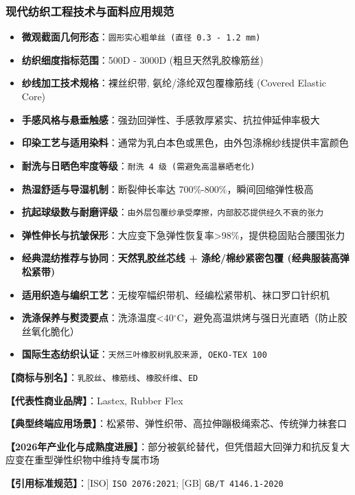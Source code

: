 \documentclass[11pt,openright,twoside,UTF8]{ctexbook}
\begin{document}
\subsubsection*{现代纺织工程技术与面料应用规范}
\begin{itemize} \setlength{\itemsep}{2pt}
    \item \textbf{微观截面几何形态}：\texttt{圆形实心粗单丝 (直径 0.3 - 1.2 mm)}
    \item \textbf{纺织细度指标范围}：500D - 3000D (粗旦天然乳胶橡筋丝)
    \item \textbf{纱线加工技术规格}：裸丝织带, 氨纶/涤纶双包覆橡筋线 (Covered Elastic Core)
    \item \textbf{手感风格与悬垂触感}：强劲回弹性、手感敦厚紧实、抗拉伸延伸率极大
    \item \textbf{印染工艺与适用染料}：通常为乳白本色或黑色，由外包涤棉纱线提供丰富颜色
    \item \textbf{耐洗与日晒色牢度等级}：\texttt{耐洗 4 级 (需避免高温暴晒老化)}
    \item \textbf{热湿舒适与导湿机制}：断裂伸长率达 700\%-800\%，瞬间回缩弹性极高
    \item \textbf{抗起球级数与耐磨评级}：\texttt{由外层包覆纱承受摩擦，内部胶芯提供经久不衰的张力}
    \item \textbf{弹性伸长与抗皱保形}：大应变下急弹性恢复率\textgreater{}98\%，提供稳固贴合腰围张力
    \item \textbf{经典混纺推荐与协同}：\textbf{天然乳胶丝芯线 + 涤纶/棉纱紧密包覆 (经典服装高弹松紧带)}
    \item \textbf{适用织造与编织工艺}：无梭窄幅织带机、经编松紧带机、袜口罗口针织机
    \item \textbf{洗涤保养与熨烫要点}：洗涤温度\textless{}40$^\circ\mathrm{C}$，避免高温烘烤与强日光直晒（防止胶丝氧化脆化）
    \item \textbf{国际生态纺织认证}：\texttt{天然三叶橡胶树乳胶来源, OEKO-TEX 100}
\end{itemize}
\vspace{0.2cm}

\noindent\textbf{【商标与别名】}：\texttt{乳胶丝}、\texttt{橡筋线}、\texttt{橡胶纤维}、\texttt{ED}\par
\noindent\textbf{【代表性商业品牌】}：Lastex, Rubber Flex\par
\noindent\textbf{【典型终端应用场景】}：松紧带、弹性织带、高拉伸蹦极绳索芯、传统弹力袜套口\par
\noindent\textbf{【2026年产业化与成熟度进展】}：部分被氨纶替代，但凭借超大回弹力和抗反复大应变在重型弹性织物中维持专属市场\par
\noindent\textbf{【引用标准规范】}：[ISO] \texttt{ISO 2076:2021}; [GB] \texttt{GB/T 4146.1-2020}\par
\vspace{0.5cm}
\end{document}
